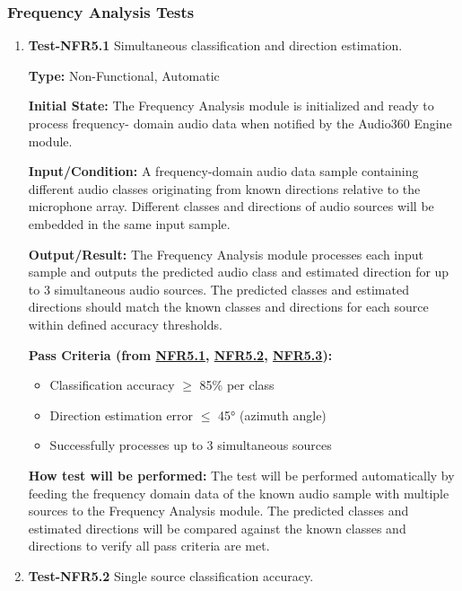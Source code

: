 \documentclass[12pt, titlepage]{article}
\begin{document}
\subsubsection{Frequency Analysis Tests}

\begin{enumerate}

\item{\textbf{Test-NFR5.1} Simultaneous classification and direction
estimation.\\}

\textbf{Type:} Non-Functional, Automatic

\textbf{Initial State:}
The Frequency Analysis module is initialized and ready to process frequency-
domain audio data when notified by the Audio360 Engine module.

\textbf{Input/Condition:}
A frequency-domain audio data sample containing different audio classes
originating from known directions relative to the microphone array. Different
classes and directions of audio sources will be embedded in the same input
sample.

\textbf{Output/Result:}
The Frequency Analysis module processes each input sample and outputs the
predicted audio class and estimated direction for up to 3 simultaneous audio
sources. The predicted classes and estimated directions should match the known
classes and directions for each source within defined accuracy thresholds.

\textbf{Pass Criteria (from \hyperref[SRS-NFR5_1]{NFR5.1}, \hyperref[SRS-NFR5_2]{NFR5.2}, \hyperref[SRS-NFR5_3]{NFR5.3}):}
\begin{itemize}
\item Classification accuracy $\geq$ 85\% per class
\item Direction estimation error $\leq$ 45° (azimuth angle)
\item Successfully processes up to 3 simultaneous sources
\end{itemize}

\textbf{How test will be performed:}
The test will be performed automatically by feeding the frequency domain data of
the known audio sample with multiple sources to the Frequency Analysis module.
The predicted classes and estimated directions will be compared against the
known classes and directions to verify all pass criteria are met.

\item{\textbf{Test-NFR5.2} Single source classification accuracy.\\}
 

\end{enumerate}
\end{document}
